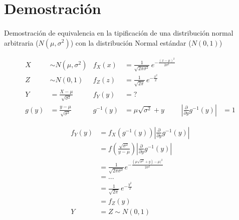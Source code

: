 \documentclass{article}
\begin{document}
	\maketitle
  \thispagestyle{empty}

  \section{Demostración}
  \label{sec:demostration}

    \paragraph{}
    Demostración de equivalencia en la tipificación de una distribución normal arbitraria ($N(\mu,\sigma^2)$) con la distribución Normal estándar ($N(0,1)$)

    \begin{align}
      X &\sim N(\mu,\sigma^2) & f_X(x) &= {\displaystyle {\frac {1}{\sqrt {2\pi \sigma ^{2}}}}\,e^{-{\frac {(x-\mu )^{2}}{2\sigma ^{2}}}}}\\
      Z &\sim N(0,1) & f_Z(z) &= {\displaystyle {\frac {1}{\sqrt {2\pi}}}\,e^{-{\frac {x^{2}}{2}}}} \\
      Y &= \frac{X-\mu}{\sqrt{\sigma^2}} & f_Y(y)&=? \\
      g(y) &= \frac{y-\mu}{\sqrt{\sigma^2}} & g^{-1}(y) &= \mu\sqrt{\sigma^2} + y &\left| \frac{\partial}{\partial y} g^{-1} (y) \right| &= 1
    \end{align}

    \begin{align}
      f_Y(y)  &= f_X \left( g^{-1} (y) \right) \left| \frac{\partial}{\partial y} g^{-1} (y) \right| \\
            &= f(\frac{\sqrt{\sigma^2}}{y-\mu}) \left| \frac{\partial}{\partial y} g^{-1} (y) \right|\\
            &= \frac{1}{\sqrt{2\pi\sigma^2}}e^{-{\frac{(\mu\sqrt{\sigma^2} + y)-\mu )^2}{2\sigma^2}}} \\
            &= ... \\
            &={\displaystyle {\frac {1}{\sqrt {2\pi}}}\,e^{-{\frac {y^{2}}{2}}}}\\
            &=f_Z(y) \\
      Y &= Z \sim N(0,1)
    \end{align}
	\nocite{prob2017}

  
  
\end{document}

